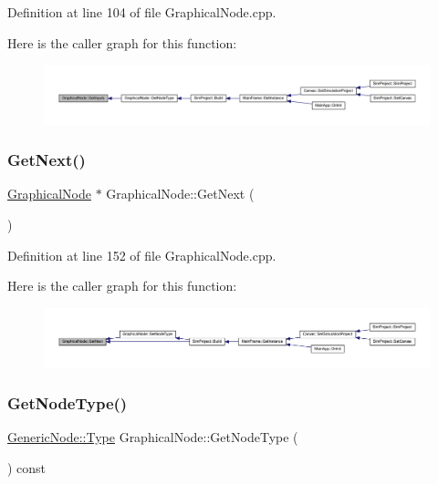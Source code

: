 Definition at line 104 of file Graphical\+Node.\+cpp.

Here is the caller graph for this function\+:
\nopagebreak
\begin{figure}[H]
\begin{center}
\leavevmode
\includegraphics[width=350pt]{class_graphical_node_a338a09b81d0be860210659f312fd5347_icgraph}
\end{center}
\end{figure}
\mbox{\label{class_graphical_node_a77ea0722141f7915424a8db83b72f8c8}} 
\subsubsection{\texorpdfstring{Get\+Next()}{GetNext()}}
{\footnotesize\ttfamily \hyperlink{class_graphical_node}{Graphical\+Node} $\ast$ Graphical\+Node\+::\+Get\+Next (\begin{DoxyParamCaption}{ }\end{DoxyParamCaption})}



Definition at line 152 of file Graphical\+Node.\+cpp.

Here is the caller graph for this function\+:
\nopagebreak
\begin{figure}[H]
\begin{center}
\leavevmode
\includegraphics[width=350pt]{class_graphical_node_a77ea0722141f7915424a8db83b72f8c8_icgraph}
\end{center}
\end{figure}
\mbox{\label{class_graphical_node_a4c5493ddcfca4d433421ae06eac1b19a}} 
\subsubsection{\texorpdfstring{Get\+Node\+Type()}{GetNodeType()}}
{\footnotesize\ttfamily \hyperlink{class_generic_node_a9e7985ab9bbfa1c85091adc0ab71a6b6}{Generic\+Node\+::\+Type} Graphical\+Node\+::\+Get\+Node\+Type (\begin{DoxyParamCaption}{ }\end{DoxyParamCaption}) const\hspace{0.3cm}{\ttfamily [inline]}}



